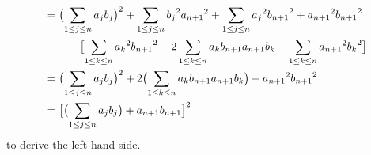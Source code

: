 \begin{exercises}
\begin{answer}
\begin{align*}
         &=
         \bigl( \sum_{1\leq j\leq n}a_jb_j\bigr)^2              
         +
         \sum_{1\leq j\leq n}{b_j}^2{a_{n+1}}^2
         +
         \sum_{1\leq j\leq n}{a_j}^2{b_{n+1}}^2
         +
         {a_{n+1}}^2{b_{n+1}}^2                          \\              
         &\hbox{}\qquad\hbox{}-
         \bigl[\sum_{1\leq k\leq n}{a_k}^2{b_{n+1}}^2
           -2\sum_{1\leq k\leq n}a_kb_{n+1}a_{n+1}b_k
           +\sum_{1\leq k\leq n}{a_{n+1}}^2{b_k}^2\bigr]        \\
         &=
         \bigl( \sum_{1\leq j\leq n}a_jb_j\bigr)^2
         +2\bigl(\sum_{1\leq k\leq n}a_kb_{n+1}a_{n+1}b_k\bigr)
         +{a_{n+1}}^2{b_{n+1}}^2                                 \\
         &=
         \bigl[\bigl(\sum_{1\leq j\leq n}a_jb_j\bigr)+a_{n+1}b_{n+1}\bigr]^2
       \end{align*}
       to derive the left-hand side.  
   \end{answer}
\end{exercises}

